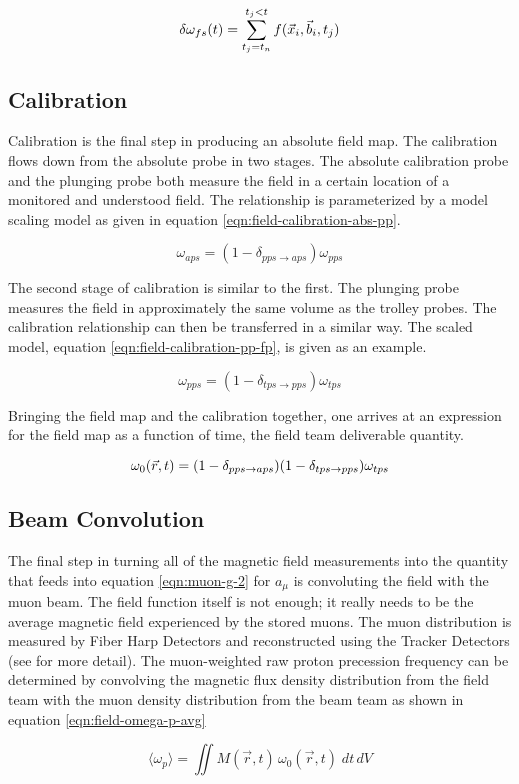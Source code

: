 \begin{equation}
\label{eqn:field-interpolation-fm}
\delta \omega_{fs}(t) \\
= \sum_{t_j = t_n}^{t_j < t} f(\vec{x}_i, \vec{b}_i, t_j)
\end{equation}

\subsection{Calibration}

Calibration is the final step in producing an absolute field map.  The calibration flows down from the absolute probe in two stages.  The absolute calibration probe and the plunging probe both measure the field in a certain location of a monitored and understood field.  The relationship is parameterized by a model scaling model as given in equation \ref{eqn:field-calibration-abs-pp}.

\begin{equation}
\label{eqn:field-calibration-abs-pp}
\omega_{aps} = (1 - \delta_{pps \rightarrow aps})\omega_{pps}
\end{equation}

The second stage of calibration is similar to the first.  The plunging probe measures the field in approximately the same volume as the trolley probes.  The calibration relationship can then be transferred in a similar way.  The scaled model, equation \ref{eqn:field-calibration-pp-fp}, is given as an example.

\begin{equation}
\label{eqn:field-calibration-pp-fp}
\omega_{pps} = (1 - \delta_{tps \rightarrow pps})\omega_{tps}
\end{equation}

Bringing the field map and the calibration together, one arrives at an expression for the field map as a function of time, the field team deliverable quantity.

\begin{equation}
\label{eqn:field-omega-p}
\omega_0(\vec{r}, t) = (1 - \delta_{pps \rightarrow aps}) \\
(1 - \delta_{tps \rightarrow pps}) \omega_{tps}
\end{equation}

\subsection{Beam Convolution}

The final step in turning all of the magnetic field measurements into the quantity that feeds into equation \ref{eqn:muon-g-2} for $a_\mu$ is convoluting the field with the muon beam.  The field function itself is not enough; it really needs to be the average magnetic field experienced by the stored muons.  The muon distribution is measured by Fiber Harp Detectors and reconstructed using the Tracker Detectors (see \cite{e989-tdr} for more detail).  The muon-weighted raw proton precession frequency can be determined by convolving the magnetic flux density distribution from the field team with the muon density distribution from the beam team as shown in equation \ref{eqn:field-omega-p-avg}

\begin{equation}
\label{eqn:field-omega-p-avg}
\langle \omega_p \rangle = \iint M(\vec{r}, t) \, \omega_0(\vec{r}, t)\; dt\,dV
\end{equation}
